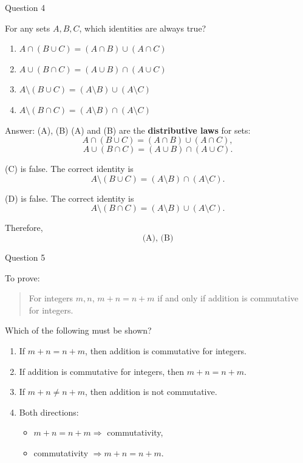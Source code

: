 \documentclass[aspectratio=169,11pt]{beamer}
\begin{document}
\begin{frame}{Question 4}

For any sets $A,B,C$, which identities are always true?

\begin{enumerate}
    \item[(A)] $A\cap(B\cup C)=(A\cap B)\cup(A\cap C)$
    \item[(B)] $A\cup(B\cap C)=(A\cup B)\cap(A\cup C)$
    \item[(C)] $A\setminus(B\cup C)=(A\setminus B)\cup(A\setminus C)$
    \item[(D)] $A\setminus(B\cap C)=(A\setminus B)\cap(A\setminus C)$
\end{enumerate}

\end{frame}

\begin{frame}

\begin{block}{Answer: (A), (B)}
(A) and (B) are the \textbf{distributive laws} for sets:
$$
A\cap(B\cup C)=(A\cap B)\cup(A\cap C),
$$
$$
A\cup(B\cap C)=(A\cup B)\cap(A\cup C).
$$

(C) is false. The correct identity is
$$
A\setminus(B\cup C)
=(A\setminus B)\cap(A\setminus C).
$$

(D) is false. The correct identity is
$$
A\setminus(B\cap C)
=(A\setminus B)\cup(A\setminus C).
$$

Therefore,
$$
\boxed{\text{(A), (B)}}
$$
\end{block}

\end{frame}
\begin{frame}{Question 5}

To prove:

\begin{quote}
For integers $m,n$, $m+n=n+m$ if and only if addition is
commutative for integers.
\end{quote}

Which of the following must be shown?

\begin{enumerate}
    \item[(A)] If $m+n=n+m$, then addition is commutative for integers.
    \item[(B)] If addition is commutative for integers, then $m+n=n+m$.
    \item[(C)] If $m+n\neq n+m$, then addition is not commutative.
    \item[(D)] Both directions:
    \begin{itemize}
        \item[(i)] $m+n=n+m\Rightarrow$ commutativity,
        \item[(ii)] commutativity $\Rightarrow m+n=n+m$.
    \end{itemize}
\end{enumerate}

\end{frame}
\end{document}

